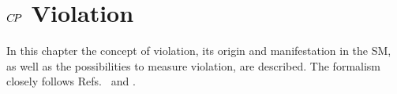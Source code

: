 
\chapter{\texorpdfstring{${C\!P}$}{CP} Violation}
\label{sec:cpviolation}

In this chapter the concept of \CP violation, its origin and manifestation in
the SM, as well as the possibilities to measure \CP violation, are described.
The formalism closely follows Refs.~\cite{Harrison:1998yr} and
\cite{Branco:1999fs}.









